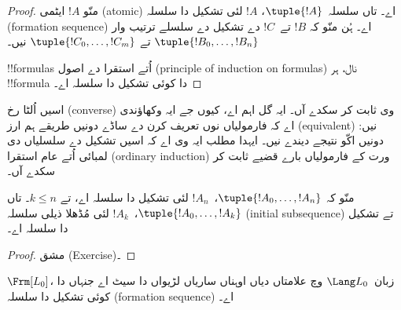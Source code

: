 \documentclass[../../../include/open-logic-section]{subfiles}
\begin{document}
\begin{proof}
منّو $!A$ ایٹمی (atomic) اے۔ تاں سلسلہ~$\tuple{!A}$، $!A$ لئی تشکیل
دا سلسلہ (formation sequence) اے۔
%
ہُن منّو کہ $!B$ تے~$!C$ دے تشکیل دے سلسلے ترتیب وار
$\tuple{!B_0,\dotsc,!B_n}$ تے $\tuple{!C_0,\dotsc,!C_m}$ نیں۔
%
\begin{enumerate}
\end{enumerate}
!!{formula}s اُتے استقرا دے اصول (principle of induction on formulas)
نال، ہر !!{formula} دا کوئی تشکیل دا سلسلہ اے۔
\end{proof}

اسیں اُلٹا رخ (converse) وی ثابت کر سکدے آں۔ ایہ گل اہم اے، کیوں جے
ایہ وکھاؤندی اے کہ فارمولیاں نوں تعریف کرن دے ساڈے دونیں طریقے ہم ارز
(equivalent) نیں: دونیں اکّو نتیجے دیندے نیں۔ ایہدا مطلب ایہ وی اے کہ
اسیں تشکیل دے سلسلیاں دی لمبائی اُتے عام استقرا (ordinary induction)
ورت کے فارمولیاں بارے قضیے ثابت کر سکدے آں۔

\begin{lem}
منّو کہ $\tuple{!A_0,\dotsc,!A_n}$،~$!A_n$ لئی تشکیل دا سلسلہ اے، تے
$k \leq n$۔ تاں $\tuple{!A_0,\dotsc,!A_k}$،~$!A_k$ لئی مُڈھلا ذیلی
سلسلہ (initial subsequence) تے تشکیل دا سلسلہ اے۔
\end{lem}

\begin{proof}
مشق (Exercise)۔
\end{proof}

\begin{thm}
$\Frm[L_0]$، زبان~$\Lang L_0$ وچ علامتاں دیاں اوہناں ساریاں لڑیواں
دا سیٹ اے جنہاں دا کوئی تشکیل دا سلسلہ (formation sequence) اے۔
\end{thm}
\end{document}

